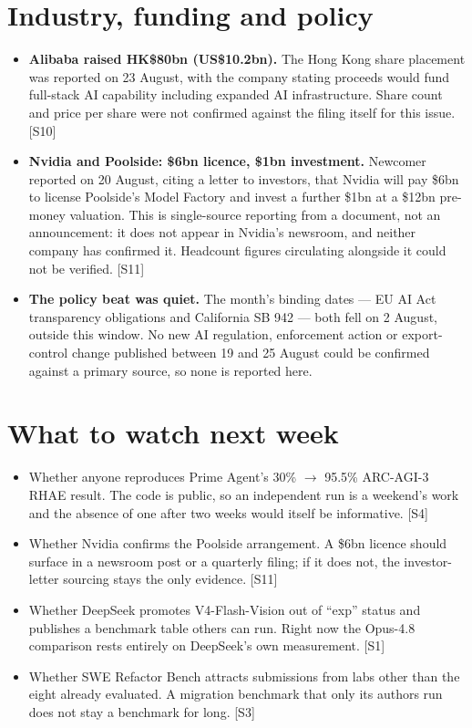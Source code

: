 \documentclass[11pt,a4paper]{article}
\newcommand{\srcref}[1]{\textcolor{brandaccent}{[S#1]}}
\begin{document}
\section{Industry, funding and policy}
\begin{itemize}
  \item \textbf{Alibaba raised HK\$80bn (US\$10.2bn).} The Hong Kong share
        placement was reported on 23 August, with the company stating proceeds
        would fund full-stack AI capability including expanded AI infrastructure.
        Share count and price per share were not confirmed against the filing
        itself for this issue. \srcref{10}
  \item \textbf{Nvidia and Poolside: \$6bn licence, \$1bn investment.} Newcomer
        reported on 20 August, citing a letter to investors, that Nvidia will pay
        \$6bn to license Poolside's Model Factory and invest a further \$1bn at a
        \$12bn pre-money valuation. This is single-source reporting from a
        document, not an announcement: it does not appear in Nvidia's newsroom,
        and neither company has confirmed it. Headcount figures circulating
        alongside it could not be verified. \srcref{11}
  \item \textbf{The policy beat was quiet.} The month's binding dates --- EU AI
        Act transparency obligations and California SB 942 --- both fell on
        2 August, outside this window. No new AI regulation, enforcement action
        or export-control change published between 19 and 25 August could be
        confirmed against a primary source, so none is reported here.
\end{itemize}

\section{What to watch next week}
\begin{itemize}
  \item Whether anyone reproduces Prime Agent's 30\% $\rightarrow$ 95.5\%
        ARC-AGI-3 RHAE result. The code is public, so an independent run is a
        weekend's work and the absence of one after two weeks would itself be
        informative. \srcref{4}
  \item Whether Nvidia confirms the Poolside arrangement. A \$6bn licence should
        surface in a newsroom post or a quarterly filing; if it does not, the
        investor-letter sourcing stays the only evidence. \srcref{11}
  \item Whether DeepSeek promotes V4-Flash-Vision out of ``exp'' status and
        publishes a benchmark table others can run. Right now the Opus-4.8
        comparison rests entirely on DeepSeek's own measurement. \srcref{1}
  \item Whether SWE Refactor Bench attracts submissions from labs other than the
        eight already evaluated. A migration benchmark that only its authors run
        does not stay a benchmark for long. \srcref{3}
\end{itemize}
\end{document}
